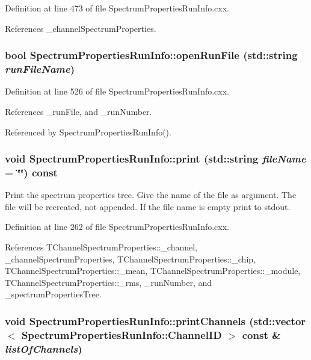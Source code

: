 Definition at line 473 of file SpectrumPropertiesRunInfo.cxx.

References \_\-channelSpectrumProperties.\hypertarget{class_spectrum_properties_run_info_a8253f12715497ad525f27104c8ce4a85}{
\subsubsection[{openRunFile}]{\setlength{\rightskip}{0pt plus 5cm}bool SpectrumPropertiesRunInfo::openRunFile (std::string {\em runFileName})}}
\label{class_spectrum_properties_run_info_a8253f12715497ad525f27104c8ce4a85}


Definition at line 526 of file SpectrumPropertiesRunInfo.cxx.

References \_\-runFile, and \_\-runNumber.

Referenced by SpectrumPropertiesRunInfo().\hypertarget{class_spectrum_properties_run_info_a585bf973ed2708d8095ad7510cb67724}{
\subsubsection[{print}]{\setlength{\rightskip}{0pt plus 5cm}void SpectrumPropertiesRunInfo::print (std::string {\em fileName} = {\ttfamily \char`\"{}\char`\"{}}) const}}
\label{class_spectrum_properties_run_info_a585bf973ed2708d8095ad7510cb67724}


Print the spectrum properties tree. Give the name of the file as argument. The file will be recreated, not appended. If the file name is empty print to stdout. 

Definition at line 262 of file SpectrumPropertiesRunInfo.cxx.

References TChannelSpectrumProperties::\_\-channel, \_\-channelSpectrumProperties, TChannelSpectrumProperties::\_\-chip, TChannelSpectrumProperties::\_\-mean, TChannelSpectrumProperties::\_\-module, TChannelSpectrumProperties::\_\-rms, \_\-runNumber, and \_\-spectrumPropertiesTree.\hypertarget{class_spectrum_properties_run_info_aae84c9751a720ce8ec1fa702b54713d1}{
\subsubsection[{printChannels}]{\setlength{\rightskip}{0pt plus 5cm}void SpectrumPropertiesRunInfo::printChannels (std::vector$<$ {\bf SpectrumPropertiesRunInfo::ChannelID} $>$ const \& {\em listOfChannels})}}
\label{class_spectrum_properties_run_info_aae84c9751a720ce8ec1fa702b54713d1}


